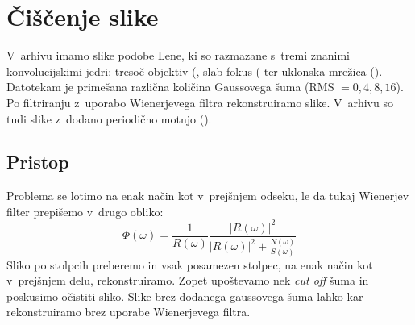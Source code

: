 \documentclass[a4paper,pdftex,10pt]{article}
\numberwithin{figure}{section} %
\begin{document}
\section{Čiščenje slike}
V~arhivu  imamo slike podobe Lene, ki so razmazane s~tremi znanimi
konvolucijskimi jedri: tresoč objektiv (, slab fokus (
ter uklonska mrežica (). Datotekam je primešana različna količina
Gaussovega šuma (RMS $= 0,4,8,16$). Po filtriranju z~uporabo Wienerjevega filtra 
rekonstruiramo slike. V~arhivu so tudi slike z~dodano periodično motnjo ().
\subsection{Pristop}
Problema se lotimo na enak način kot v~prejšnjem odseku, le da tukaj Wienerjev filter
prepišemo v~drugo obliko:
\begin{equation}
    \Phi (\omega) = \frac{1}{R(\omega)} \frac{|R(\omega)|^2}{|R(\omega)|^2 + 
    \frac{N(\omega)}{S(\omega)}}
\end{equation}
Sliko po stolpcih preberemo in vsak posamezen stolpec, na enak način kot v~prejšnjem delu, 
rekonstruiramo. Zopet upoštevamo nek \emph{cut off} šuma in poskusimo očistiti sliko.
Slike brez dodanega gaussovega šuma lahko kar rekonstruiramo brez uporabe Wienerjevega 
filtra.
\end{document}
